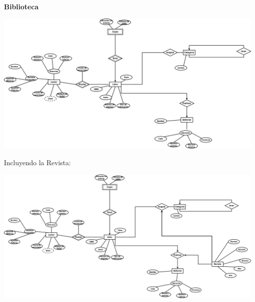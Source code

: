 \textbf{Biblioteca}

\begin{center}
    \includegraphics[width=16cm]{resources/3.a_Biblio.drawio.png}
\end{center}

Incluyendo la Revista:

\begin{center}
    \includegraphics[width=16cm]{resources/3.a_BiblioRevista.drawio.png}
\end{center}



